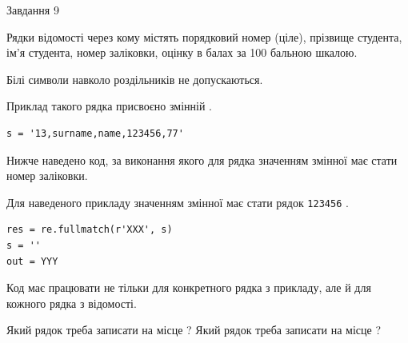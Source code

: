 \documentclass[12pt, ukrainian]{article}
\def\code#1{\Verb!#1!}
\begin{document}
{\begin{minipage}[t]{8.0cm}
\end{minipage}

               
{\begin{center}Завдання {9}\end{center}}
\vspace{-4mm}
Рядки відомості через кому містять порядковий номер (ціле), пріз\-ви\-ще студен\-та, ім'я студента, номер заліковки, оцінку в балах за 100 бальною шкалою.

Білі символи навколо роздільників не допускаються.

Приклад такого рядка присвоєно змінній .



\begin{verbatim}
s = '13,surname,name,123456,77'
\end{verbatim}


Нижче наведено код, за виконання якого для рядка  значенням змінної  має стати номер заліковки.

Для наведеного прикладу значенням змінної  має стати рядок \code{123456} .



\begin{verbatim}
res = re.fullmatch(r'XXX', s)
s = ''
out = YYY
\end{verbatim}


Код має працювати не тільки для конкретного рядка з прикладу, але й для кожного рядка з відомості.


Який рядок треба записати на місце  ?
Який рядок треба записати на місце  ?\par

}
\end{document}
